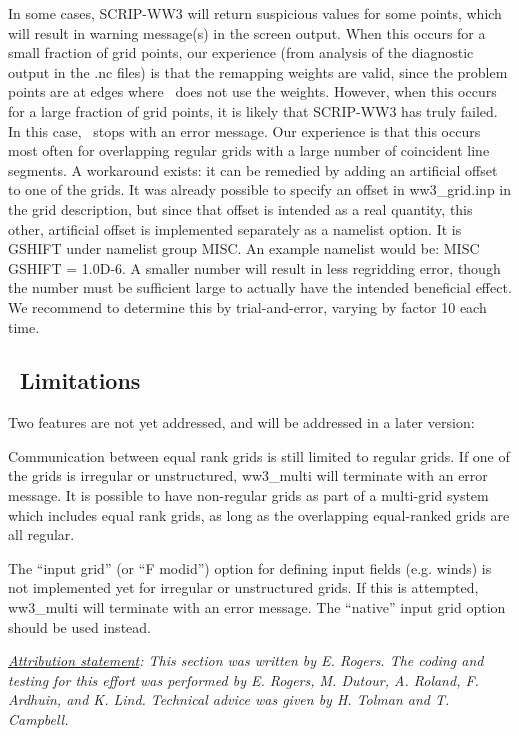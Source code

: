 In some cases, SCRIP-WW3 will return suspicious values for some points, which
will result in warning message(s) in the screen output. When this occurs for a
small fraction of grid points, our experience (from analysis of the diagnostic
output in the {\file .nc} files) is that the remapping weights are valid,
since the problem points are at edges where \ws\ does not use the
weights. However, when this occurs for a large fraction of grid points, it is
likely that SCRIP-WW3 has truly failed. In this case, \ws\ stops with an error
message. Our experience is that this occurs most often for overlapping regular
grids with a large number of coincident line segments. A workaround exists: it 
can be remedied by adding an artificial offset to one of the grids. It was already 
possible to specify an offset in {\file ww3\_grid.inp} in the grid description,
but since that offset is intended as a real quantity, this other, artificial 
offset is implemented separately as a namelist option. It is {\code GSHIFT} 
under namelist group {\code MISC}. An example namelist would be: {\code MISC 
GSHIFT = 1.0D-6}. A smaller number will result in less regridding error, 
though the number must be sufficient large to actually have the intended 
beneficial effect. We recommend to determine this by trial-and-error, varying 
by factor 10 each time. 

\vssub
\subsection{~Limitations} \label{sec:scripE}
\vssub

Two features are not yet addressed, and will be addressed in a later version:
\begin{list}{)\hfill}
            { \leftmargin 15mm 
             \rightmargin 5mm \itemsep 0mm \parsep 0mm}
\item  Communication between equal rank grids is still limited to regular
  grids. If one of the grids is irregular or unstructured, {\file ww3\_multi}
  will terminate with an error message. It is possible to have non-regular
  grids as part of a multi-grid system which includes equal rank grids, as
  long as the overlapping equal-ranked grids are all regular.

\item The ``input grid'' (or ``{F  modid}'') option for defining input fields
  (e.g. winds) is not implemented yet for irregular or unstructured grids. If
  this is attempted, {\file ww3\_multi} will terminate with an error
  message. The ``native'' input grid option should be used instead.

\end{list}

\noindent
\textrm{\textit{\underline{Attribution statement}: This section was written by
    E. Rogers. The coding and testing for this effort was performed by
    E. Rogers, M. Dutour, A. Roland, F. Ardhuin, and K. Lind. Technical advice
    was given by H. Tolman and T. Campbell.}}

